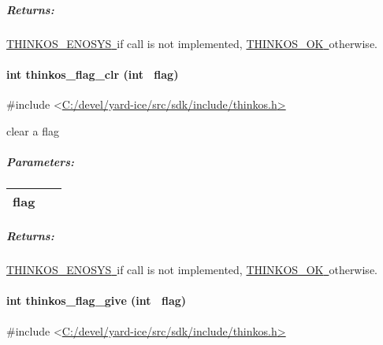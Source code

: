 {\subparagraph{\texorpdfstring{{Returns:}}{Returns:}}\label{returns-39}

{\protect\hyperlink{h.3s49zyc}{THINKOS\_ENOSYS}}{\protect\hyperlink{h.3s49zyc}{~}}{if
call is not implemented,
}{\protect\hyperlink{h.2fk6b3p}{THINKOS\_OK}}{\protect\hyperlink{h.2fk6b3p}{~}}{otherwise.
}

\paragraph{\texorpdfstring{{int thinkos\_flag\_clr (int
~flag)}}{int thinkos\_flag\_clr (int ~flag)}}\label{int-thinkos_flag_clr-int-flag}

{}

{\#include
\textless{}}{\protect\hyperlink{h.pkwqa1}{C:/devel/yard-ice/src/sdk/include/thinkos.h}}{\protect\hyperlink{h.pkwqa1}{\textgreater{}}}

{clear a flag }

{}

\subparagraph{\texorpdfstring{{Parameters:}}{Parameters:}}\label{parameters-36}

\protect\hypertarget{t.383f7e723be615a1ab251cbb171dc44f8c48c9f4}{}{}\protect\hypertarget{t.36}{}{}

\begin{longtable}[]{@{}ll@{}}
\toprule
\begin{minipage}[t]{0.47\columnwidth}\raggedright\strut
{flag}{~}\strut
\end{minipage} & \begin{minipage}[t]{0.47\columnwidth}\raggedright\strut
{}\strut
\end{minipage}\tabularnewline
\bottomrule
\end{longtable}

\subparagraph{\texorpdfstring{{Returns:}}{Returns:}}\label{returns-40}

{\protect\hyperlink{h.3s49zyc}{THINKOS\_ENOSYS}}{\protect\hyperlink{h.3s49zyc}{~}}{if
call is not implemented,
}{\protect\hyperlink{h.2fk6b3p}{THINKOS\_OK}}{\protect\hyperlink{h.2fk6b3p}{~}}{otherwise.
}

\paragraph{\texorpdfstring{{int thinkos\_flag\_give (int
~flag)}}{int thinkos\_flag\_give (int ~flag)}}\label{int-thinkos_flag_give-int-flag}

{}

{\#include
\textless{}}{\protect\hyperlink{h.pkwqa1}{C:/devel/yard-ice/src/sdk/include/thinkos.h}}{\protect\hyperlink{h.pkwqa1}{\textgreater{}}}

}
